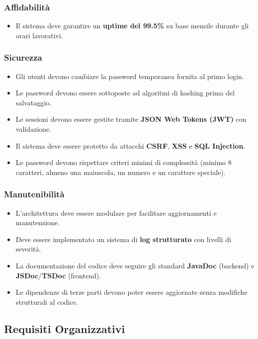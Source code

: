\subsubsection{Affidabilità}
\begin{itemize}
    \item Il sistema deve garantire un \textbf{uptime del 99.5\%} su base mensile durante gli orari lavorativi.
\end{itemize}

\subsubsection{Sicurezza}
\begin{itemize}
    \item Gli utenti devono cambiare la password temporanea fornita al primo login.
    \item Le password devono essere sottoposte ad algoritmi di hashing prima del salvataggio.
    \item Le sessioni devono essere gestite tramite \textbf{JSON Web Tokens (JWT)} con validazione.
    \item Il sistema deve essere protetto da attacchi \textbf{CSRF}, \textbf{XSS} e \textbf{SQL Injection}.
    \item Le password devono rispettare criteri minimi di complessità (minimo 8 caratteri, almeno una maiuscola, un numero e un carattere speciale).
\end{itemize}

\subsubsection{Manutenibilità}
\begin{itemize}
    \item L'architettura deve essere modulare per facilitare aggiornamenti e manutenzione.
    \item Deve essere implementato un sistema di \textbf{log strutturato} con livelli di severità.
    \item La documentazione del codice deve seguire gli standard \textbf{JavaDoc} (backend) e \textbf{JSDoc}/\textbf{TSDoc} (frontend).
    \item Le dipendenze di terze parti devono poter essere aggiornate senza modifiche strutturali al codice.
\end{itemize}

\subsection{Requisiti Organizzativi}

